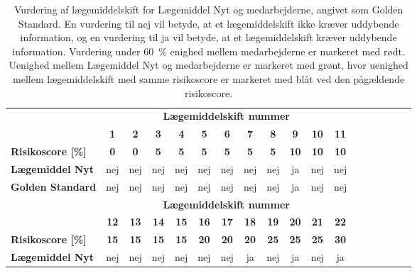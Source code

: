 \vspace{0.5cm}
\begin{longtable}{|l|c|c|c|c|c|c|c|c|c|c|c|c|c|c|c|c|c|}
\caption{Vurdering af lægemiddelskift for Lægemiddel Nyt og medarbejderne, angivet som Golden Standard. En vurdering til nej vil betyde, at et lægemiddelskift ikke kræver uddybende information, og en vurdering til ja vil betyde, at et lægemiddelskift kræver uddybende information. Vurdering under 60~\% enighed mellem medarbejderne er markeret med rødt. Uenighed mellem Lægemiddel Nyt og medarbejderne er markeret med grønt, hvor uenighed mellem lægemiddelskift med samme risikoscore er markeret med blåt ved den pågældende risikoscore.}
	\label{table:test2} \\ \hline
\rowcolor[HTML]{C0C0C0} \textbf{} & \multicolumn{11}{|c|}{\textbf{Lægemiddelskift nummer}} \\
\rowcolor[HTML]{C0C0C0} & \textbf{1} & \textbf{2} & \textbf{3} & \textbf{4} & \textbf{5} & \textbf{6} & \textbf{7} &  \textbf{8} & \textbf{9} & \textbf{10} & \textbf{11}   \\ \hline
\cellcolor[HTML]{C0C0C0}\textbf{Risikoscore [\%]} & \textbf{0}  & \textbf{0} &\textbf{5} & \textbf{5} & \textbf{5} & \textbf{5} & \textbf{5} & \textbf{5} & \cellcolor[HTML]{34CDF9}\textbf{10} &  \textbf{10} & \textbf{10} \\ \hline
\cellcolor[HTML]{C0C0C0}\textbf{Lægemiddel Nyt} & nej & nej & nej & nej & nej & nej & nej & nej & ja & nej & nej \\ \hline
\cellcolor[HTML]{C0C0C0}\textbf{Golden Standard} & nej & nej & nej& nej & nej &nej & nej & nej& ja & nej & nej \\ \hline
\newpage
\rowcolor[HTML]{C0C0C0} & \multicolumn{11}{|c|}{\textbf{Lægemiddelskift nummer}} \\
\rowcolor[HTML]{C0C0C0} & \textbf{12} & \textbf{13} & \textbf{14} &  \textbf{15} & \textbf{16} & \textbf{17} & \textbf{18} & \textbf{19} & \textbf{20} & \textbf{21} & \textbf{22}  \\ \hline
\cellcolor[HTML]{C0C0C0}\textbf{Risikoscore [\%]} & \cellcolor[HTML]{F6E6E5} \textbf{15} & \textbf{15} & \cellcolor[HTML]{34CDF9}\textbf{15} & \textbf{15} & \textbf{20} & \textbf{20} & \cellcolor[HTML]{34CDF9}\textbf{20} & \textbf{25} & \cellcolor[HTML]{34CDF9}\textbf{25} & \textbf{25} & \cellcolor[HTML]{34CDF9}\textbf{30} \\ \hline
\cellcolor[HTML]{C0C0C0}\textbf{Lægemiddel Nyt} & \cellcolor[HTML]{F6E6E5}nej & nej & \cellcolor[HTML]{32CB00}nej & nej & nej & nej & \cellcolor[HTML]{32CB00}ja & \cellcolor[HTML]{32CB00}nej & \cellcolor[HTML]{32CB00}ja & \cellcolor[HTML]{32CB00} nej & ja\\ \hline

\end{longtable}
